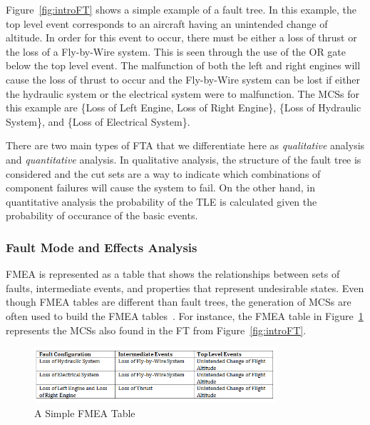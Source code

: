 Figure~\ref{fig:introFT} shows a simple example of a fault tree. In this example, the top level event corresponds to an aircraft having an unintended change of altitude. In order for this event to occur, there must be either a loss of thrust or the loss of a Fly-by-Wire system. This is seen through the use of the OR gate below the top level event. The malfunction of both the left and right engines will cause the loss of thrust to occur and the Fly-by-Wire system can be lost if either the hydraulic system or the electrical system were to malfunction. The MCSs for this example are \{Loss of Left Engine, Loss of Right Engine\}, \{Loss of Hydraulic System\}, and \{Loss of Electrical System\}. 

There are two main types of FTA that we differentiate here as \textit{qualitative} analysis and \textit{quantitative} analysis. In qualitative analysis, the structure of the fault tree is considered and the cut sets are a way to indicate which combinations of component failures will cause the system to fail. On the other hand, in quantitative analysis the probability of the TLE is calculated given the probability of occurance of the basic events. 


\subsubsection{Fault Mode and Effects Analysis}
FMEA is represented as a table that shows the relationships between sets of faults, intermediate events, and properties that represent undesirable states. Even though FMEA tables are different than fault trees, the generation of MCSs are often used to build the FMEA tables~\cite{Bozzano:2010:DSA:1951720}. For instance, the FMEA table in Figure~\ref{fig:introFMEA} represents the MCSs also found in the FT from Figure~\ref{fig:introFT}.

\begin{figure}[h]
\begin{center}
\includegraphics[width=9cm]{images/fmea.png}
\caption{A Simple FMEA Table} \label{fig:introFMEA}
\end{center}
\end{figure}

